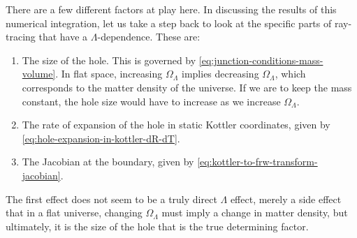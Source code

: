 There are a few different factors at play here. In discussing the results of this numerical integration, let us take a step back to look at the specific parts of ray-tracing that have a $\Lambda$-dependence. These are:
\begin{enumerate}
  \item The size of the hole. This is governed by \autoref{eq:junction-conditions-mass-volume}. In flat space, increasing $\Omega_{\Lambda}$ implies decreasing $\Omega_{\Lambda}$, which corresponds to the matter density of the universe. If we are to keep the mass constant, the hole size would have to increase as we increase $\Omega_{\Lambda}$. 
  \item The rate of expansion of the hole in static Kottler coordinates, given by \autoref{eq:hole-expansion-in-kottler-dR-dT}.  
  \item The Jacobian at the boundary, given by \autoref{eq:kottler-to-frw-transform-jacobian}.
\end{enumerate}

The first effect does not seem to be a truly direct $\Lambda$ effect, merely a side effect that in a flat universe, changing $\Omega_{\Lambda}$ must imply a change in matter density, but ultimately, it is the size of the hole that is the true determining factor. 